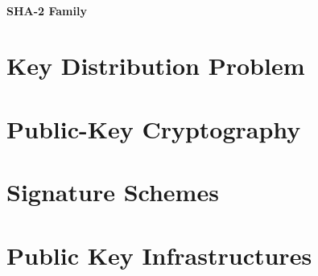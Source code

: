\documentclass{article}
\theoremstyle{quest}
\begin{document}
\paragraph{SHA-2 Family}

\section{Key Distribution Problem}

\section{Public-Key Cryptography}

\section{Signature Schemes}

\section{Public Key Infrastructures}
\end{document}
